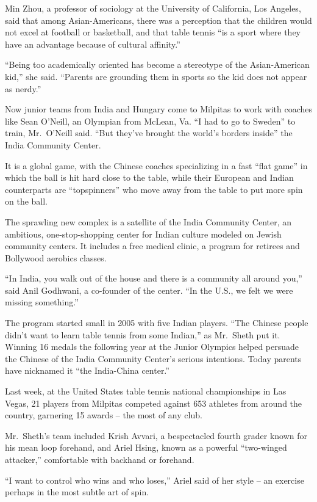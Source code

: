 ﻿\documentclass[12pt]{article}
\begin{document}
Min Zhou, a professor of sociology at the University of California, Los Angeles, said that among
Asian-Americans, there was a perception that the children would not excel at football or basketball,
and that table tennis ``is a sport where they have an advantage because of cultural affinity.''

``Being too academically oriented has become a stereotype of the Asian-American kid,'' she said.
``Parents are grounding them in sports so the kid does not appear as nerdy.''

Now junior teams from India and Hungary come to Milpitas to work with coaches like Sean O'Neill, an
Olympian from McLean, Va. ``I had to go to Sweden'' to train, Mr.~O'Neill said. ``But they've
brought the world's borders inside'' the India Community Center.

It is a global game, with the Chinese coaches specializing in a fast ``flat game'' in which the ball
is hit hard close to the table, while their European and Indian counterparts are ``topspinners'' who
move away from the table to put more spin on the ball.

The sprawling new complex is a satellite of the India Community Center, an ambitious,
one-stop-shopping center for Indian culture modeled on Jewish community centers. It includes a free
medical clinic, a program for retirees and Bollywood aerobics classes.

``In India, you walk out of the house and there is a community all around you,'' said Anil Godhwani,
a co-founder of the center. ``In the U.S., we felt we were missing something.''

The program started small in 2005 with five Indian players. ``The Chinese people didn't want to
learn table tennis from some Indian,'' as Mr.~Sheth put it. Winning 16 medals the following year at
the Junior Olympics helped persuade the Chinese of the India Community Center's serious intentions.
Today parents have nicknamed it ``the India-China center.''

Last week, at the United States table tennis national championships in Las Vegas, 21 players from
Milpitas competed against 653 athletes from around the country, garnering 15 awards -- the most of
any club.

Mr.~Sheth's team included Krish Avvari, a bespectacled fourth grader known for his mean loop
forehand, and Ariel Hsing, known as a powerful ``two-winged attacker,'' comfortable with backhand or
forehand.

``I want to control who wins and who loses,'' Ariel said of her style -- an exercise perhaps in the
most subtle art of spin.
\end{document}

